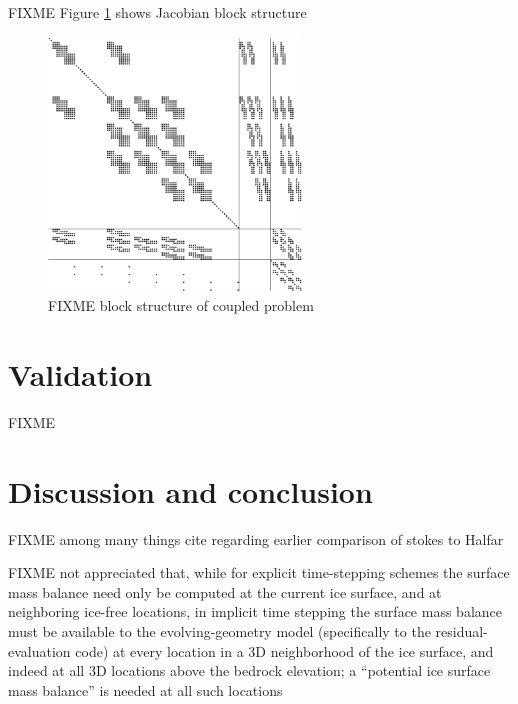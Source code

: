 \documentclass[letterpaper,final,12pt,reqno]{amsart}
\begin{document}
FIXME Figure \ref{fig:blockstructure} shows Jacobian block structure

\begin{figure}[ht]
\begin{center}
\includegraphics[width=0.6\textwidth]{figs/coarsespy.pdf}
\end{center}
\caption{FIXME block structure of coupled problem}
\label{fig:blockstructure}
\end{figure}


\section{Validation} \label{sec:validation}

FIXME


\section{Discussion and conclusion} \label{sec:discussion}

FIXME among many things cite \cite{LeysingerGudmundsson2004} regarding earlier comparison of stokes to Halfar

FIXME not appreciated that, while for explicit time-stepping schemes the surface mass balance need only be computed at the current ice surface, and at neighboring ice-free locations, in implicit time stepping the surface mass balance must be available to the evolving-geometry model (specifically to the residual-evaluation code) at every location in a 3D neighborhood of the ice surface, and indeed at all 3D locations above the bedrock elevation; a ``potential ice surface mass balance'' is needed at all such locations

\appendix
\end{document}
